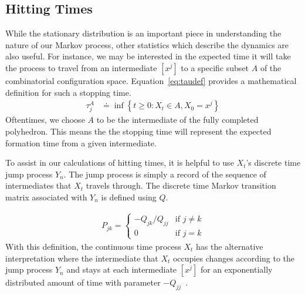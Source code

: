 

\subsection{Hitting Times}

While the stationary distribution is an important piece in understanding the nature of our Markov process, other statistics which describe the dynamics are also useful. For instance, we may be interested in the expected time it will take the process to travel from an intermediate $[x^j]$ to a specific subset $A$ of the combinatorial configuration space. Equation~\ref{eq:taudef} provides a mathematical definition for such a stopping time.
\begin{align}
  \label{eq:taudef}
	\tau^{A}_{j} &\doteq \inf\left\{t \geq 0 : X_t \in A, X_0 = x^j\right\}
\end{align}
Oftentimes, we choose $A$ to be the intermediate of the fully completed polyhedron. This means the the stopping time will represent the expected formation time from a given intermediate.
 
To assist in our calculations of hitting times, it is helpful to use $X_t$'s discrete time jump process $Y_n$. The jump process is simply a record of the sequence of intermediates that $X_t$ travels through. The discrete time Markov transition matrix associated with $Y_n$ is defined using $Q$.

\begin{align}
  \label{eq:Pdef}
  P_{jk} =
  \begin{cases}
   -Q_{jk}/Q_{jj} & \text{if } j \neq k  \\
   0  & \text{if } j = k 
  \end{cases}
\end{align}
With this definition, the continuous time process $X_t$ has the alternative interpretation where the intermediate that $X_t$ occupies changes according to the jump process $Y_n$ and stays at each intermediate $[x^j]$ for an exponentially distributed amount of time with parameter $-Q_{jj}$~\cite{Norris1998}. 
%
%

